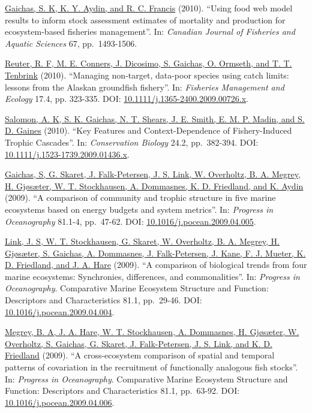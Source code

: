 \documentclass[11pt, a4paper]{awesome-cv}
\begin{document}
\protect\hyperlink{cite-gaichas_using_2010}{Gaichas, S. K, K. Y. Aydin, and R.
C. Francis} (2010). ``Using food web model
results to inform stock assessment estimates of mortality and
production for ecosystem-based fisheries management''. In: \emph{Canadian
Journal of Fisheries and Aquatic Sciences} 67, pp.~1493-1506.

\protect\hyperlink{cite-reuter_managing_2010}{Reuter, R. F, M. E. Conners, J.
Dicosimo, S. Gaichas, O. Ormseth, and T. T.
Tenbrink} (2010). ``Managing non-target,
data-poor species using catch limits: lessons from the Alaskan
groundfish fishery''. In: \emph{Fisheries Management and Ecology} 17.4, pp.
323-335. DOI:
\href{https://doi.org/10.1111\%2Fj.1365-2400.2009.00726.x}{10.1111/j.1365-2400.2009.00726.x}.

\protect\hyperlink{cite-salomon_key_2010}{Salomon, A. K, S. K. Gaichas, N. T.
Shears, J. E. Smith, E. M. P. Madin, and S. D.
Gaines} (2010). ``Key Features and
Context-Dependence of Fishery-Induced Trophic Cascades''. In:
\emph{Conservation Biology} 24.2, pp.~382-394. DOI:
\href{https://doi.org/10.1111\%2Fj.1523-1739.2009.01436.x}{10.1111/j.1523-1739.2009.01436.x}.

\protect\hyperlink{cite-gaichas_comparison_2009}{Gaichas, S, G. Skaret, J.
Falk-Petersen, J. S. Link, W. Overholtz, B. A. Megrey, H. Gjøsæter, W.
T. Stockhausen, A. Dommasnes, K. D. Friedland, and K.
Aydin} (2009). ``A comparison of
community and trophic structure in five marine ecosystems based on
energy budgets and system metrics''. In: \emph{Progress in Oceanography}
81.1-4, pp.~47-62. DOI:
\href{https://doi.org/10.1016\%2Fj.pocean.2009.04.005}{10.1016/j.pocean.2009.04.005}.

\protect\hyperlink{cite-link_comparison_2009}{Link, J. S, W. T. Stockhausen, G.
Skaret, W. Overholtz, B. A. Megrey, H. Gjøsæter, S. Gaichas, A.
Dommasnes, J. Falk-Petersen, J. Kane, F. J. Mueter, K. D. Friedland,
and J. A. Hare} (2009). ``A comparison of
biological trends from four marine ecosystems: Synchronies,
differences, and commonalities''. In: \emph{Progress in Oceanography}.
Comparative Marine Ecosystem Structure and Function: Descriptors and
Characteristics 81.1, pp.~29-46. DOI:
\href{https://doi.org/10.1016\%2Fj.pocean.2009.04.004}{10.1016/j.pocean.2009.04.004}.

\protect\hyperlink{cite-megrey_cross-ecosystem_2009}{Megrey, B. A, J. A. Hare,
W. T. Stockhausen, A. Dommasnes, H. Gjøsæter, W. Overholtz, S. Gaichas,
G. Skaret, J. Falk-Petersen, J. S. Link, and K. D.
Friedland} (2009). ``A
cross-ecosystem comparison of spatial and temporal patterns of
covariation in the recruitment of functionally analogous fish stocks''.
In: \emph{Progress in Oceanography}. Comparative Marine Ecosystem Structure
and Function: Descriptors and Characteristics 81.1, pp.~63-92. DOI:
\href{https://doi.org/10.1016\%2Fj.pocean.2009.04.006}{10.1016/j.pocean.2009.04.006}.
\end{document}
